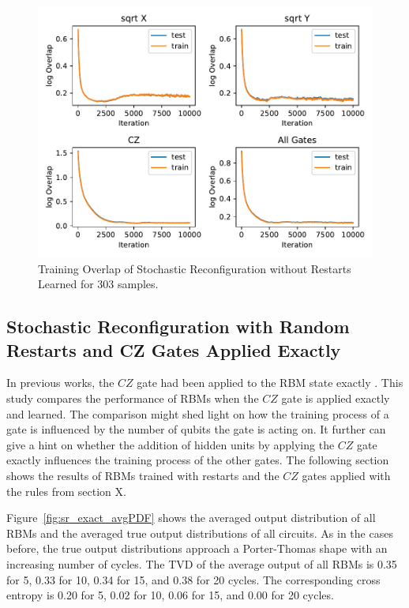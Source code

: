 \begin{figure}[H]
  \centering
  \includegraphics[width=\textwidth]{figures/results/SR-no-restarts-learned/avgOverlap_303.pdf}
  \caption[Training Overlap of Stochastic Reconfiguration without Restarts Learned]{Training 
  Overlap of Stochastic Reconfiguration without Restarts Learned for 303 samples.}
  \label{fig:sr_no_restarts_overlap_303}
\end{figure}

\newpage

\subsection{Stochastic Reconfiguration with Random Restarts and CZ Gates Applied Exactly}

In previous works, the $CZ$ gate had been applied to the RBM state exactly \cite{jnsson2018neuralnetwork}. This study compares 
the performance of RBMs when the $CZ$ gate is applied exactly and learned. The comparison might shed
light on how the training process of a gate is influenced by the number of qubits the gate 
is acting on. It further can give a hint on whether the addition of hidden units by applying the $CZ$
gate exactly influences the training process of the other gates.
The following section shows the results of RBMs trained with restarts and the $CZ$ gates applied 
with the rules from section X.

Figure~\ref{fig:sr_exact_avgPDF} shows the averaged output distribution of all RBMs and
the averaged true output distributions of all circuits. As in the cases before, the 
true output distributions approach a Porter-Thomas shape with an increasing number of cycles.
The TVD of the average output of all RBMs 
is 0.35 for 5, 0.33 for 10, 0.34 for 15, and 0.38 for 20 cycles. The corresponding cross entropy is 
0.20 for 5, 0.02 for 10, 0.06 for 15, and 0.00 for 20 cycles.

